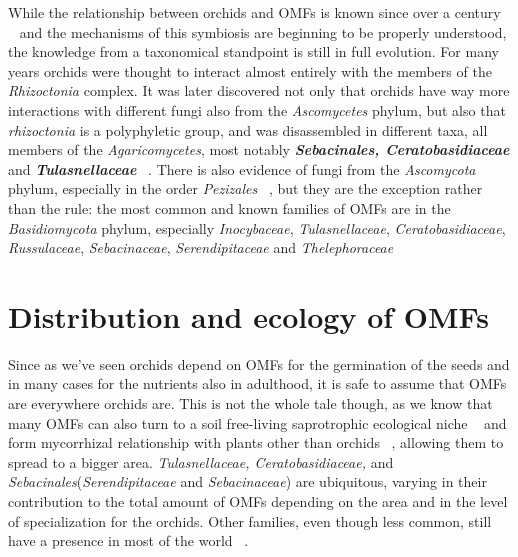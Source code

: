 While the relationship between orchids and OMFs is known since over a century ~\citep{bernard1899, rayner1927, rasmussen2002, selosse2011} and the mechanisms of this symbiosis are beginning to be properly understood, the knowledge from a taxonomical standpoint is still in full evolution. For many years orchids were thought to interact almost entirely with the members of the \emph{Rhizoctonia} complex. It was later discovered not only that orchids have way more interactions with different fungi also from the \emph{Ascomycetes} phylum, but also that \emph{rhizoctonia} is a polyphyletic group, and was disassembled in different taxa, all members of the \emph{Agaricomycetes}, most notably \textbf{\emph{Sebacinales, Ceratobasidiaceae}} and \textbf{\emph{Tulasnellaceae}} ~\citep{dearnaley2012}.
There is also evidence of fungi from the \emph{Ascomycota} phylum, especially in the order \emph{Pezizales} ~\citep{selosse2004, ouanphanivanh2008, waterman2011}, but they are the exception rather than the rule: the most common and known families of OMFs are in the \emph{Basidiomycota} phylum, especially \emph{Inocybaceae}, \emph{Tulasnellaceae}, \emph{Ceratobasidiaceae}, \emph{Russulaceae}, \emph{Sebacinaceae}, \emph{Serendipitaceae} and \emph{Thelephoraceae} ~\citep{taylor2004, roy2009, duffy2019}

\section{Distribution and ecology of OMFs}
\label{distributionandecologyofomfs}

Since as we've seen orchids depend on OMFs for the germination of the seeds and in many cases for the nutrients also in adulthood, it is safe to assume that OMFs are everywhere orchids are. This is not the whole tale though, as we know that many OMFs can also turn to a soil free-living saprotrophic ecological niche ~\citep{oberwinkler2017} and form mycorrhizal relationship with plants other than orchids ~\citep{selosse2014}, allowing them to spread to a bigger area. \emph{Tulasnellaceae, Ceratobasidiaceae,} and \emph{Sebacinales}(\emph{Serendipitaceae} and \emph{Sebacinaceae}) are ubiquitous, varying in their contribution to the total amount of OMFs depending on the area and in the level of specialization for the orchids. Other families, even though less common, still have a presence in most of the world ~\citep{jacquemyn2017}.

